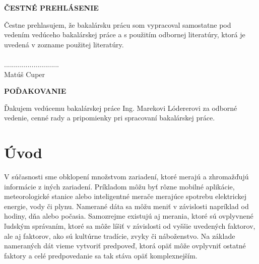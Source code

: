 \documentclass[a4paper,slovak,12pt,appendix]{article}
\begin{document}
\begin{titlepage}
\vspace*{15cm}
\begin{large}
  \noindent \textbf{ČESTNÉ PREHLÁSENIE} \par
\end{large}
\vspace*{0.5cm}
\noindent
Čestne prehlasujem, že bakalársku prácu som vypracoval samostatne pod vedením
vedúceho bakalárskej práce a s použitím odbornej literatúry, ktorá je uvedená
v zozname použitej literatúry. \\
\vspace*{0.5cm}\\
\hspace*{10cm}............................\\
\hspace*{10.7cm} Matúš Cuper
\end{titlepage}

\begin{titlepage}
\vspace*{15cm}
\begin{large}
  \noindent \textbf{POĎAKOVANIE} \par
\end{large}
\vspace*{0.5cm}
\noindent
Ďakujem vedúcemu bakalárskej práce Ing. Marekovi Lódererovi za odborné vedenie,
cenné rady a pripomienky pri spracovaní bakalárskej práce.
\end{titlepage}


\newpage
\tableofcontents
\thispagestyle{empty}                                                           %

\newpage
\listoffigures
\thispagestyle{empty}

\newpage
\listoftables
\thispagestyle{empty}


\newpage
\setcounter{page}{1}
\section{Úvod}
V súčasnosti sme obklopení množstvom zariadení, ktoré merajú a zhromažďujú
informácie z iných zariadení. Príkladom môžu byť rôzne mobilné aplikácie,
meteorologické stanice alebo inteligentné merače merajúce spotrebu elektrickej
energie, vody či plynu. Namerané dáta sa môžu meniť v závislosti napríklad od
hodiny, dňa alebo počasia. Samozrejme existujú aj merania, ktoré sú ovplyvnené
ľudským správaním, ktoré sa môže líšiť v závislosti od vyššie uvedených
faktorov, ale aj faktorov, ako sú kultúrne tradície, zvyky či náboženstvo. Na
základe nameraných dát vieme vytvoriť predpoveď, ktorá opäť môže ovplyvniť
ostatné faktory a celé predpovedanie sa tak stáva opäť komplexnejším.
\end{document}
